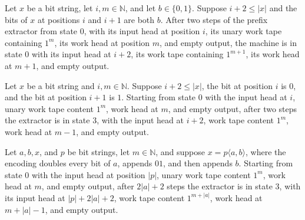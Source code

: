 \begin{lemma}
\label{Complexity.tmsat_take_double}
\leanok
{}
Let $x$ be a bit string, let $i,m\in\mathbb N$, and let $b\in\{0,1\}$. Suppose $i+2\le
|x|$ and the bits of $x$ at positions $i$ and $i+1$ are both $b$. After two steps of the
prefix extractor from state $0$, with its input head at position $i$, its unary work
tape containing $1^m$, its work head at position $m$, and empty output, the machine is
in state $0$ with its input head at $i+2$, its work tape containing $1^{m+1}$, its work
head at $m+1$, and empty output.
\end{lemma}

\begin{lemma}
\label{Complexity.tmsat_take_separator}
\leanok
{}
Let $x$ be a bit string and $i,m\in\mathbb N$. Suppose $i+2\le |x|$, the bit at position
$i$ is $0$, and the bit at position $i+1$ is $1$. Starting from state $0$ with the input
head at $i$, unary work tape content $1^m$, work head at $m$, and empty output, after
two steps the extractor is in state $3$, with the input head at $i+2$, work tape content
$1^m$, work head at $m-1$, and empty output.
\end{lemma}

\begin{lemma}
\label{Complexity.tmsat_take_parse}
\leanok
{}
Let $a,b,x$, and $p$ be bit strings, let $m\in\mathbb N$, and suppose $x=p\langle
a,b\rangle$, where the encoding doubles every bit of $a$, appends $01$, and then appends
$b$. Starting from state $0$ with the input head at position $|p|$, unary work tape
content $1^m$, work head at $m$, and empty output, after $2|a|+2$ steps the extractor is
in state $3$, with its input head at $|p|+2|a|+2$, work tape content $1^{m+|a|}$, work
head at $m+|a|-1$, and empty output.
\end{lemma}

